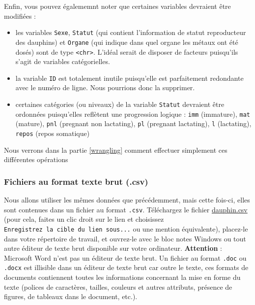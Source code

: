 \documentclass[a4paperpaper,]{article}
\providecommand{\tightlist}{%
  \setlength{\itemsep}{0pt}\setlength{\parskip}{0pt}}
\begin{document}
Enfin, vous pouvez égalememnt noter que certaines variables devraient être modifiées :

\begin{itemize}
\tightlist
\item
  les variables \texttt{Sexe}, \texttt{Statut} (qui contient l'information de statut reproducteur des dauphins) et \texttt{Organe} (qui indique dans quel organe les métaux ont été dosés) sont de type \texttt{\textless{}chr\textgreater{}}. L'idéal serait de disposer de facteurs puisqu'ils s'agit de variables catégorielles.
\item
  la variable \texttt{ID} est totalement inutile puisqu'elle est parfaitement redondante avec le numéro de ligne. Nous pourrions donc la supprimer.
\item
  certaines catégories (ou niveaux) de la variable \texttt{Statut} devraient être ordonnées puisqu'elles reflètent une progression logique : \texttt{imm} (immature), \texttt{mat} (mature), \texttt{pnl} (pregnant non lactating), \texttt{pl} (pregnant lactating), \texttt{l} (lactating), \texttt{repos} (repos somatique)
\end{itemize}

Nous verrons dans la partie \ref{wrangling} comment effectuer simplement ces différentes opérations

\hypertarget{fichiers-au-format-texte-brut-.csv}{%
\subsubsection{Fichiers au format texte brut (.csv)}\label{fichiers-au-format-texte-brut-.csv}}

Nous allons utiliser les mêmes données que précédemment, mais cette fois-ci, elles sont contenues dans un fichier au format \texttt{.csv}. Téléchargez le fichier \href{data/dauphin.csv}{dauphin.csv} (pour cela, faites un clic droit sur le lien et choisissez \texttt{Enregistrez\ la\ cible\ du\ lien\ sous...} ou une mention équivalente), placez-le dans votre répertoire de travail, et ouvrez-le avec le bloc notes Windows ou tout autre éditeur de texte brut disponible sur votre ordinateur. \textbf{Attention} : Microsoft Word n'est pas un éditeur de texte brut. Un fichier au format \texttt{.doc} ou \texttt{.docx} est illisible dans un éditeur de texte brut car outre le texte, ces formats de documents contiennent toutes les informations concernant la mise en forme du texte (polices de caractères, tailles, couleurs et autres attributs, présence de figures, de tableaux dans le document, etc.).
\end{document}
